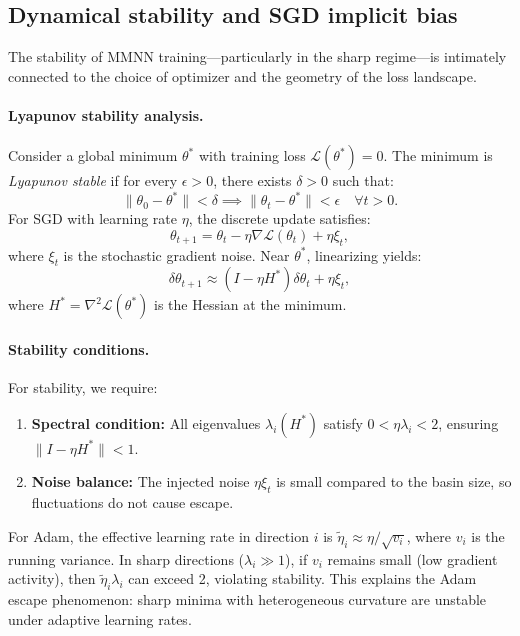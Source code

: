 \documentclass{article}
\begin{document}
\vspace{1em}
\subsection{Dynamical stability and SGD implicit bias}
\label{sec:dynamical_stability}
The stability of MMNN training—particularly in the sharp regime—is intimately connected to the choice of optimizer and the geometry of the loss landscape.

\paragraph{Lyapunov stability analysis.}
Consider a global minimum \( \theta^* \) with training loss \( \mathcal{L}(\theta^*) = 0 \). The minimum is \emph{Lyapunov stable} if for every \( \epsilon > 0 \), there exists \( \delta > 0 \) such that:
\[
\|\theta_0 - \theta^*\| < \delta \implies \|\theta_t - \theta^*\| < \epsilon \quad \forall t > 0.
\]
For SGD with learning rate \( \eta \), the discrete update satisfies:
\[
\theta_{t+1} = \theta_t - \eta \nabla \mathcal{L}(\theta_t) + \eta \xi_t,
\]
where \( \xi_t \) is the stochastic gradient noise. Near \( \theta^* \), linearizing yields:
\[
\delta\theta_{t+1} \approx (I - \eta H^*) \delta\theta_t + \eta \xi_t,
\]
where \( H^* = \nabla^2 \mathcal{L}(\theta^*) \) is the Hessian at the minimum.

\paragraph{Stability conditions.}
For stability, we require:
\begin{enumerate}
    \item \textbf{Spectral condition:} All eigenvalues \( \lambda_i(H^*) \) satisfy \( 0 < \eta \lambda_i < 2 \), ensuring \( \|I - \eta H^*\| < 1 \).
    \item \textbf{Noise balance:} The injected noise \( \eta \xi_t \) is small compared to the basin size, so fluctuations do not cause escape.
\end{enumerate}

For Adam, the effective learning rate in direction \( i \) is \( \tilde{\eta}_i \approx \eta / \sqrt{v_i} \), where \( v_i \) is the running variance. In sharp directions (\( \lambda_i \gg 1 \)), if \( v_i \) remains small (low gradient activity), then \( \tilde{\eta}_i \lambda_i \) can exceed 2, violating stability. This explains the Adam escape phenomenon: sharp minima with heterogeneous curvature are unstable under adaptive learning rates.
\end{document}

